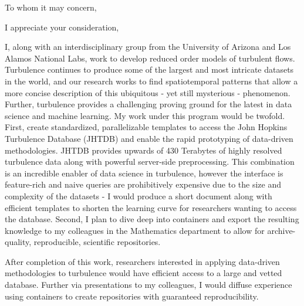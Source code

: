 \documentclass[11pt,a4paper,sans]{moderncv}        %
\renewcommand*{\bibliographyitemlabel}{[\arabic{enumiv}]}
\begin{document}
\clearpage
\date{\today}
\opening{To whom it may concern,}
\closing{I appreciate your consideration,}
\makelettertitle

   I, along with an interdisciplinary group from the University of Arizona and Los Alamos National Labs, work to develop reduced order models of turbulent flows. Turbulence continues to produce some of the largest and most intricate datasets in the world, and our research works to find spatiotemporal patterns that allow a more concise description of this ubiquitous - yet still mysterious - phenomenon. Further, turbulence provides a challenging proving ground for the latest in data science and machine learning.
   My work under this program would be twofold. First, create standardized, parallelizable templates to access the John Hopkins Turbulence Database (JHTDB) and enable the rapid prototyping of data-driven methodologies. JHTDB provides upwards of 430 Terabytes of highly resolved turbulence data along with powerful server-side preprocessing. This combination is an incredible enabler of data science in turbulence, however the interface is feature-rich and naive queries are prohibitively expensive due to the size and complexity of the datasets - I would produce a short document along with efficient templates to shorten the learning curve for researchers wanting to access the database. Second, I plan to dive deep into containers and export the resulting knowledge to my colleagues in the Mathematics department to allow for archive-quality, reproducible, scientific repositories.

   After completion of this work, researchers interested in applying data-driven methodologies to turbulence would have efficient access to a large and vetted database. Further via presentations to my colleagues, I would diffuse experience using containers to create repositories with guaranteed reproducibility.

\makeletterclosing

\nocite{*}

\end{document}
